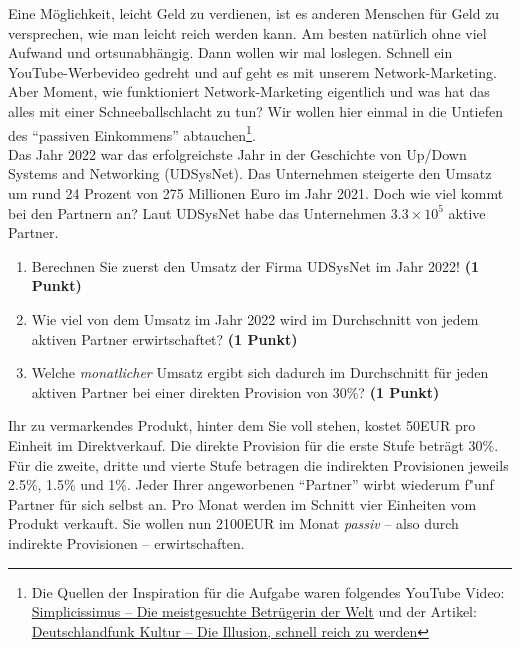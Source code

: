 \documentclass[a4paper, 9pt]{scrartcl}\usepackage[]{graphicx}\usepackage[]{xcolor}
\begin{document}
Eine M{\"o}glichkeit, leicht Geld zu verdienen, ist es anderen Menschen f{\"u}r Geld
zu versprechen, wie man leicht reich werden kann. Am besten nat{\"u}rlich ohne
viel Aufwand und ortsunabh{\"a}ngig. Dann wollen wir mal loslegen. Schnell
ein YouTube-Werbevideo gedreht und auf geht es mit unserem
Network-Marketing. Aber Moment, wie funktioniert Network-Marketing
eigentlich und was hat das alles mit einer Schneeballschlacht zu tun? Wir
wollen hier einmal in die Untiefen des "`passiven Einkommens"'
abtauchen\footnote{Die Quellen der Inspiration f{\"u}r die Aufgabe waren
  folgendes YouTube Video:
  \href{https://youtu.be/UOKkZF_qK9M?si=uf4foJVFKfeQMwSw}{Simplicissimus --
    Die meistgesuchte Betr{\"u}gerin der Welt} und der Artikel:
  \href{https://www.deutschlandfunkkultur.de/netzwerk-marketing-die-illusion-schnell-reich-zu-werden-100.html}{
    Deutschlandfunk Kultur -- Die Illusion, schnell reich zu werden}}.\\

Das Jahr 2022 war das erfolgreichste Jahr in der Geschichte von
Up/Down Systems and Networking (UDSysNet). Das Unternehmen steigerte den Umsatz um rund
24 Prozent von 275 Millionen Euro im Jahr
2021. Doch wie viel kommt bei den Partnern an? Laut
UDSysNet habe das Unternehmen \ensuremath{3.3\times 10^{5}} aktive Partner.

\begin{enumerate}
\item Berechnen Sie zuerst den Umsatz der Firma UDSysNet im
  Jahr 2022! \textbf{(1 Punkt)}
\item Wie viel von dem Umsatz im Jahr 2022 wird im Durchschnitt von jedem
  aktiven Partner erwirtschaftet? \textbf{(1 Punkt)}
\item Welche \textit{monatlicher} Umsatz ergibt sich dadurch im
  Durchschnitt f{\"u}r jeden aktiven Partner bei einer direkten Provision von
  30\%? \textbf{(1 Punkt)}
\end{enumerate}

Ihr zu vermarkendes Produkt, hinter dem Sie voll stehen, kostet
50EUR pro Einheit im Direktverkauf. Die direkte Provision
f{\"u}r die erste Stufe betr{\"a}gt 30\%. F{\"u}r die zweite, dritte und
vierte Stufe betragen die indirekten Provisionen jeweils 2.5\%,
1.5\% und 1\%. Jeder Ihrer angeworbenen "`Partner"'
wirbt wiederum f{"u}nf Partner f{\"u}r sich selbst an. Pro Monat
werden im Schnitt vier Einheiten vom Produkt verkauft. Sie wollen nun
2100EUR im Monat \textit{passiv} -- also durch indirekte
Provisionen -- erwirtschaften.
\end{document}
